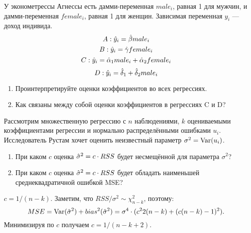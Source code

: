 \begin{problem}
У эконометрессы Агнессы есть дамми-переменная $male_i$, равная 1 для мужчин, и дамми-переменная $female_i$, равная 1 для женщин. Зависимая переменная $y_i$ — доход индивида.
\[
A: \hat{y}_i = \hat{\beta} male_i
\]
\[
B: \hat{y}_i = \hat{\gamma}female_i
\]
\[
C: \hat{y}_i = \hat{\alpha}_1male_i+\hat{\alpha}_2 female_i
\]
\[
D: \hat{y}_i =  \hat{\delta}_1 + \hat{\delta}_2male_i
\]

\begin{enumerate}
\item Проинтерпретируйте оценки коэффициентов во всех регрессиях.
\item Как связаны между собой оценки коэффициентов в регрессиях C и D?
\end{enumerate}
\begin{sol}
\end{sol}
\end{problem}


\begin{problem}
  Рассмотрим множественную регрессию с $n$ наблюдениями, $k$ оцениваемыми коэффициентами регрессии и нормально распределёнными ошибками $u_i$. Исследователь Рустам хочет оценить неизвестный параметр $\sigma^2=\operatorname{Var}(u_i)$.
  \begin{enumerate}
    \item При каком $c$ оценка  $\hat{\sigma}^2=c\cdot RSS$ будет несмещённой для параметра $\sigma^2$?
    \item При каком $c$ оценка  $\hat{\sigma}^2=c\cdot RSS$ будет обладать наименьшей среднеквадратичной ошибкой MSE?
  \end{enumerate}

\begin{sol}
$c=1/(n-k)$.
Заметим, что $RSS/\sigma^2 \sim \chi^2_{n-k}$, поэтому:
\[
MSE = \operatorname{Var}(\hat{\sigma}^2) + bias^2(\hat{\sigma}^2)=\sigma^4 \cdot (c^2 2(n-k) + (c(n-k)-1)^2).
\]
Минимизируя по $c$ получаем $c=1/(n-k+2)$.
\end{sol}
\end{problem}

